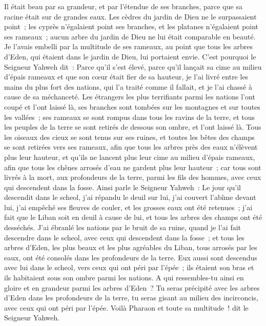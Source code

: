 \begin{multicols}{2}
Il était beau par sa grandeur, et par l'étendue de ses branches, parce que sa racine était sur de grandes eaux.
Les cèdres du jardin de Dieu ne le surpassaient point~; les cyprès n'égalaient point ses branches, et les platanes n'égalaient point ses rameaux~; aucun arbre du jardin de Dieu ne lui était comparable en beauté.
Je l'avais embelli par la multitude de ses rameaux, au point que tous les arbres d'Eden, qui étaient dans le jardin de Dieu, lui portaient envie.
C'est pourquoi le Seigneur Yahweh dit~: Parce qu'il s'est élevé, parce qu'il lançait sa cime au milieu d'épais rameaux et que son cœur était fier de sa hauteur,
je l'ai livré entre les mains du plus fort des nations, qui l'a traité comme il fallait, et je l'ai chassé à cause de sa méchanceté.
Les étrangers les plus terrifiants parmi les nations l'ont coupé et l'ont laissé là, ses branches sont tombées sur les montagnes et sur toutes les vallées~; ses rameaux se sont rompus dans tous les ravins de la terre, et tous les peuples de la terre se sont retirés de dessous son ombre, et l'ont laissé là.
Tous les oiseaux des cieux se sont tenus sur ses ruines, et toutes les bêtes des champs se sont retirées vers ses rameaux,
afin que tous les arbres près des eaux n'élèvent plus leur hauteur, et qu'ils ne lancent plus leur cime au milieu d'épais rameaux, afin que tous les chênes arrosés d'eau ne gardent plus leur hauteur~; car tous sont livrés à la mort, aux profondeurs de la terre, parmi les fils des hommes, avec ceux qui descendent dans la fosse.
Ainsi parle le Seigneur Yahweh~: Le jour qu'il descendit dans le scheol, j'ai répandu le deuil sur lui, j'ai couvert l'abîme devant lui, j'ai empêché ses fleuves de couler, et les grosses eaux ont été retenues~; j'ai fait que le Liban soit en deuil à cause de lui, et tous les arbres des champs ont été desséchés.
J'ai ébranlé les nations par le bruit de sa ruine, quand je l'ai fait descendre dans le scheol, avec ceux qui descendent dans la fosse~; et tous les arbres d'Eden, les plus beaux et les plus agréables du Liban, tous arrosés par les eaux, ont été consolés dans les profondeurs de la terre.
Eux aussi sont descendus avec lui dans le scheol, vers ceux qui ont péri par l'épée~; ils étaient son bras et ils habitaient sous son ombre parmi les nations.
A qui ressembles-tu ainsi en gloire et en grandeur parmi les arbres d'Eden~? Tu seras précipité avec les arbres d'Eden dans les profondeurs de la terre, tu seras gisant au milieu des incirconcis, avec ceux qui ont péri par l'épée. Voilà Pharaon et toute sa multitude~! dit le Seigneur Yahweh.

\end{multicols}

